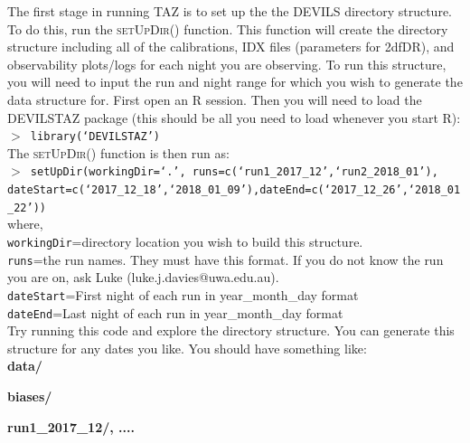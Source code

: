 \documentclass[12pt]{article}
\begin{document}
The first stage in running \textsc{TAZ} is to set up the the DEVILS directory structure. To do this, run the \textsc{setUpDir()} function. This function will create the directory structure including all of the calibrations, IDX files (parameters for 2dfDR), and observability plots/logs for each night you are observing.  To run this structure, you will need to input the run and night range for which you wish to generate the data structure for. First open an R session. Then you will need to load the \textsc{DEVILSTAZ} package (this should be all you need to load whenever you start R):\\

\hspace{10mm}  \texttt{$>$ library(`DEVILSTAZ')}\\

The \textsc{setUpDir()}  function is then run as:\\

\hspace{10mm}  \texttt{$>$ setUpDir(workingDir=`.', runs=c(`run1\_2017\_12',`run2\_2018\_01'), \\ dateStart=c(`2017\_12\_18',`2018\_01\_09'),dateEnd=c(`2017\_12\_26',`2018\_01\_22')) }\\


where, \\

 \texttt{workingDir}=directory location you wish to build this structure.\\
 \texttt{runs}=the run names. They must have this format. If you do not know the run you are on, ask Luke (luke.j.davies@uwa.edu.au).\\
 \texttt{dateStart}=First night of each run in year\_month\_day format\\
 \texttt{dateEnd}=Last night of each run in year\_month\_day format\\

Try running this code and explore the directory structure. You can generate this structure for any dates you like. You should have something like:\\

\hspace{5mm} \textbf{data/} 
\vspace{1mm}

\hspace{10mm} \textbf{biases/}
\vspace{1mm}

\hspace{15mm} \textbf{run1\_2017\_12/, ....} 
\vspace{1mm}
\end{document}
